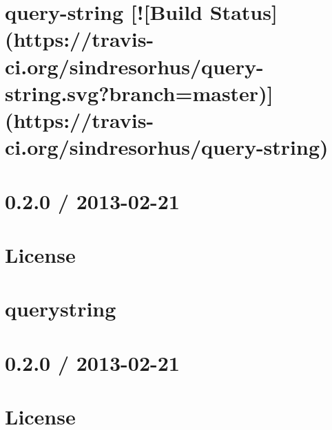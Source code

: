 \documentclass[twoside]{book}
\newcommand{\+}{\discretionary{\mbox{\scriptsize$\hookleftarrow$}}{}{}}
\begin{document}
\chapter{query-\/string \mbox{[}!\mbox{[}Build Status\mbox{]}(https\+://travis-\/ci.org/sindresorhus/query-\/string.svg?branch=master)\mbox{]}(https\+://travis-\/ci.org/sindresorhus/query-\/string)}
\label{md__c_1_workspace_demo_src_main_script_node_modules_query-string_readme}

\chapter{0.2.0 / 2013-\/02-\/21}
\label{md__c_1_workspace_demo_src_main_script_node_modules_querystring__history}

\chapter{License}
\label{md__c_1_workspace_demo_src_main_script_node_modules_querystring__license}

\chapter{querystring}
\label{md__c_1_workspace_demo_src_main_script_node_modules_querystring__readme}

\chapter{0.2.0 / 2013-\/02-\/21}
\label{md__c_1_workspace_demo_src_main_script_node_modules_querystring-es3__history}

\chapter{License}
\label{md__c_1_workspace_demo_src_main_script_node_modules_querystring-es3__license}

\end{document}
